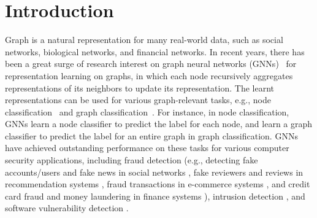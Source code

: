 \section{Introduction}
\label{sec:intro}

Graph is a natural representation for many real-world data, such as social networks, biological networks, and financial networks. In recent years, there has been a great surge of research interest on graph neural networks (GNNs)~\cite{scarselli2008graph,kipf2017semi,hamilton2017inductive,velivckovic2018graph,xu2019powerful} for representation learning on graphs, in which each node recursively aggregates representations of its neighbors to update its  representation. The learnt representations 
can be used for various graph-relevant tasks, e.g., node classification~\cite{kipf2017semi,xu2019powerful} and  graph classification~\cite{hamilton2017inductive,gilmer2017neural}.
For instance, in node classification, GNNs learn a node classifier to predict the label for each node, and learn a graph classifier to predict the label for an entire graph in graph classification.  
GNNs have achieved  outstanding performance on these tasks  for various computer security applications, including 
fraud detection (e.g., detecting fake accounts/users and fake news in social networks \cite{wang2017gang,wang2017sybilscar,gao2018sybilfuse,wang2018sybilblind,xu2022evidence}, fake reviewers and reviews in recommendation systems \cite{wang2019graph,dou2020enhancing}, fraud transactions in e-commerce systems \cite{zhang2022efraudcom}, and credit card fraud and money laundering in finance systems \cite{weber2018scalable,cheng2020graph}), 
intrusion detection \cite{zhong2024survey}, and software vulnerability detection \cite{zhou2019devign,cheng2021deepwukong,zhang2023detecting,chu2024graph}.


